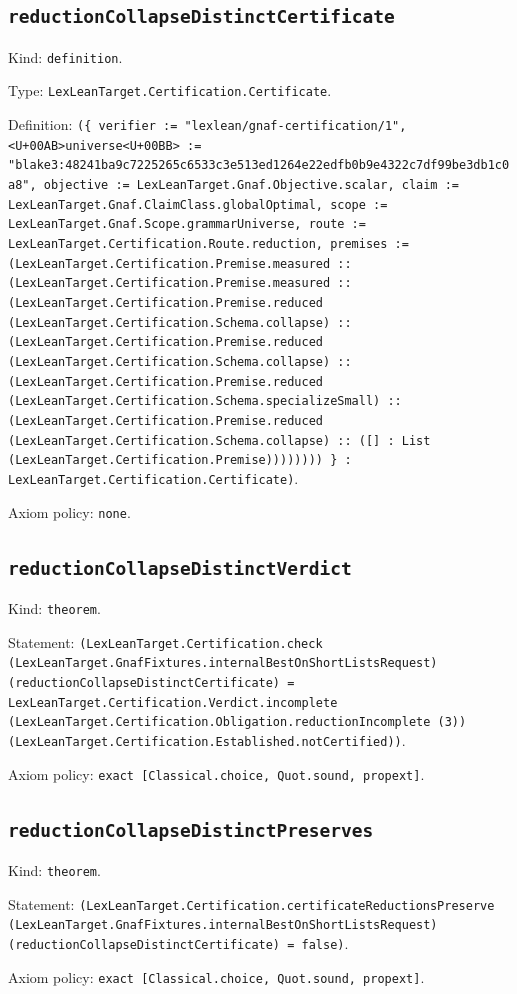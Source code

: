 \documentclass[11pt]{article}
\begin{document}
\subsection*{\texttt{reductionCollapseDistinctCertificate}}
\noindent Kind: \texttt{definition}.\par
\noindent Type: \texttt{LexLeanTarget.Certification.Certificate}.\par
\noindent Definition: \texttt{(\{ verifier := "lexlean/gnaf-certification/1", <U+00AB>universe<U+00BB> := "blake3:48241ba9c7225265c6533c3e513ed1264e22edfb0b9e4322c7df99be3db1c0a8", objective := LexLeanTarget.Gnaf.Objective.scalar, claim := LexLeanTarget.Gnaf.ClaimClass.globalOptimal, scope := LexLeanTarget.Gnaf.Scope.grammarUniverse, route := LexLeanTarget.Certification.Route.reduction, premises := (LexLeanTarget.Certification.Premise.measured :: (LexLeanTarget.Certification.Premise.measured :: (LexLeanTarget.Certification.Premise.reduced (LexLeanTarget.Certification.Schema.collapse) :: (LexLeanTarget.Certification.Premise.reduced (LexLeanTarget.Certification.Schema.collapse) :: (LexLeanTarget.Certification.Premise.reduced (LexLeanTarget.Certification.Schema.specializeSmall) :: (LexLeanTarget.Certification.Premise.reduced (LexLeanTarget.Certification.Schema.collapse) :: ([] : List (LexLeanTarget.Certification.Premise)))))))) \} : LexLeanTarget.Certification.Certificate)}.\par
\noindent Axiom policy: \texttt{none}.\par
\subsection*{\texttt{reductionCollapseDistinctVerdict}}
\noindent Kind: \texttt{theorem}.\par
\noindent Statement: \texttt{(LexLeanTarget.Certification.check (LexLeanTarget.GnafFixtures.internalBestOnShortListsRequest) (reductionCollapseDistinctCertificate) = LexLeanTarget.Certification.Verdict.incomplete (LexLeanTarget.Certification.Obligation.reductionIncomplete (3)) (LexLeanTarget.Certification.Established.notCertified))}.\par
\noindent Axiom policy: \texttt{exact [Classical.choice, Quot.sound, propext]}.\par
\subsection*{\texttt{reductionCollapseDistinctPreserves}}
\noindent Kind: \texttt{theorem}.\par
\noindent Statement: \texttt{(LexLeanTarget.Certification.certificateReductionsPreserve (LexLeanTarget.GnafFixtures.internalBestOnShortListsRequest) (reductionCollapseDistinctCertificate) = false)}.\par
\noindent Axiom policy: \texttt{exact [Classical.choice, Quot.sound, propext]}.\par
\end{document}
